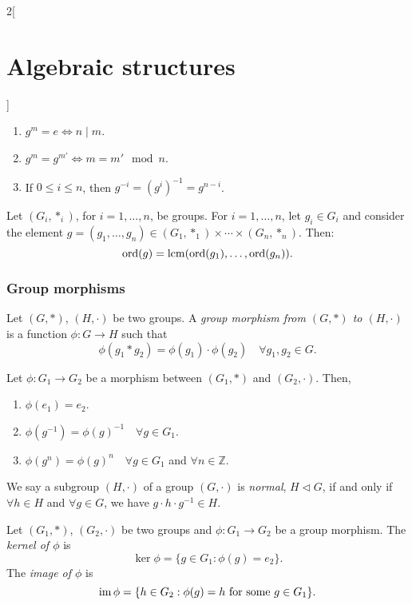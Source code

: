 \documentclass[../../../main.tex]{subfiles}
\begin{document}
\begin{multicols}{2}[\section{Algebraic structures}]
\begin{lemma}
\begin{enumerate}
        \item $g^m=e\iff n\mid m$.
        \item $g^m=g^{m'}\iff m=m'\mod{n}$.
        \item If $0\leq i\leq n$, then $g^{-i}=(g^i)^{-1}=g^{n-i}$.
    \end{enumerate}
\end{lemma}
\begin{corollary}
    Let $(G_i,*_i)$, for $i=1,\ldots, n$, be groups. For $i=1,\ldots,n$, let $g_i\in G_i$ and consider the element $g=(g_1,\ldots,g_n)\in(G_1,*_1)\times\cdots\times(G_n,*_n)$. Then: $$\text{ord}(g)=\operatorname{lcm}(\text{ord}(g_1),\ldots,\text{ord}(g_n)).$$
\end{corollary}
\subsubsection*{Group morphisms}
\begin{definition}
    Let $(G,*)$, $(H,\cdot)$ be two groups. A \textit{group morphism from $(G,*)$ to $(H,\cdot)$} is a function $\phi:G\rightarrow H$ such that $$\phi(g_1*g_2)=\phi(g_1)\cdot\phi(g_2)\quad\forall g_1,g_2\in G.$$
\end{definition}
\begin{lemma}
    Let $\phi:G_1\rightarrow G_2$ be a morphism between $(G_1,*)$ and $(G_2,\cdot)$. Then,
    \begin{enumerate}
        \item $\phi(e_1)=e_2$.
        \item $\phi(g^{-1})=\phi(g)^{-1}\quad\forall g\in G_1$.
        \item $\phi(g^n)=\phi(g)^n\quad\forall g\in G_1$ and $\forall n\in\mathbb{Z}$.
    \end{enumerate}
\end{lemma}
\begin{definition}
    We say a subgroup $(H,\cdot)$ of a group $(G,\cdot)$ is \textit{normal}, $H\lhd G$, if and only if $\forall h\in H$ and $\forall g\in G$, we have $g\cdot h\cdot g^{-1}\in H$.
\end{definition}
\begin{definition}
    Let $(G_1,*)$, $(G_2,\cdot)$ be two groups and $\phi:G_1\rightarrow G_2$ be a group morphism. The \textit{kernel of $\phi$} is $$\ker\phi=\{g\in G_1:\phi(g)=e_2\}.$$ The \textit{image of $\phi$} is $$\operatorname{im}\phi=\{h\in G_2:\phi(g)=h\text{ for some }g\in G_1\}.$$
\end{definition}
\begin{prop}

\end{prop}
\end{multicols}
\end{document}

